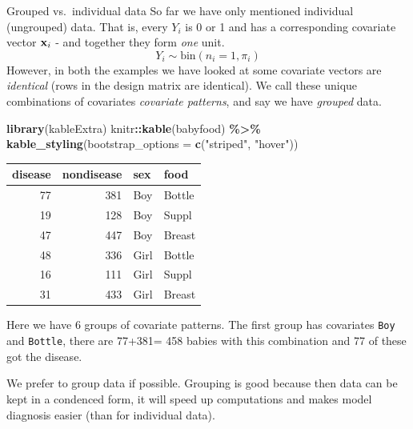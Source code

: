 \documentclass[
  ignorenonframetext,
]{beamer}
\newenvironment{Shaded}{\begin{snugshade}}{\end{snugshade}}
\newcommand{\AttributeTok}[1]{\textcolor[rgb]{0.13,0.29,0.53}{#1}}
\newcommand{\FunctionTok}[1]{\textcolor[rgb]{0.13,0.29,0.53}{\textbf{#1}}}
\newcommand{\NormalTok}[1]{#1}
\newcommand{\SpecialCharTok}[1]{\textcolor[rgb]{0.81,0.36,0.00}{\textbf{#1}}}
\newcommand{\StringTok}[1]{\textcolor[rgb]{0.31,0.60,0.02}{#1}}
\begin{document}
\begin{frame}[fragile]{Grouped vs.~individual data}
\protect\hypertarget{grouped-vs.-individual-data}{}
So far we have only mentioned individual (ungrouped) data. That is,
every \(Y_i\) is 0 or 1 and has a corresponding covariate vector
\({\bf x}_i\) - and together they form \emph{one} unit.
\[Y_i \sim \text{bin}(n_i=1,\pi_i)\] However, in both the examples we
have looked at some covariate vectors are \emph{identical} (rows in the
design matrix are identical). We call these unique combinations of
covariates \emph{covariate patterns}, and say we have \emph{grouped}
data.

\begin{Shaded}
\begin{Highlighting}[]
\FunctionTok{library}\NormalTok{(kableExtra)}
\NormalTok{knitr}\SpecialCharTok{::}\FunctionTok{kable}\NormalTok{(babyfood) }\SpecialCharTok{\%\textgreater{}\%}
  \FunctionTok{kable\_styling}\NormalTok{(}\AttributeTok{bootstrap\_options =} \FunctionTok{c}\NormalTok{(}\StringTok{"striped"}\NormalTok{, }\StringTok{"hover"}\NormalTok{))}
\end{Highlighting}
\end{Shaded}

\begin{table}
\centering
\begin{tabular}{r|r|l|l}
\hline
disease & nondisease & sex & food\\
\hline
77 & 381 & Boy & Bottle\\
\hline
19 & 128 & Boy & Suppl\\
\hline
47 & 447 & Boy & Breast\\
\hline
48 & 336 & Girl & Bottle\\
\hline
16 & 111 & Girl & Suppl\\
\hline
31 & 433 & Girl & Breast\\
\hline
\end{tabular}
\end{table}
\end{frame}

\begin{frame}[fragile]
Here we have 6 groups of covariate patterns. The first group has
covariates \texttt{Boy} and \texttt{Bottle}, there are 77+381= 458
babies with this combination and 77 of these got the disease.

We prefer to group data if possible. Grouping is good because then data
can be kept in a condenced form, it will speed up computations and makes
model diagnosis easier (than for individual data).
\end{frame}
\end{document}
